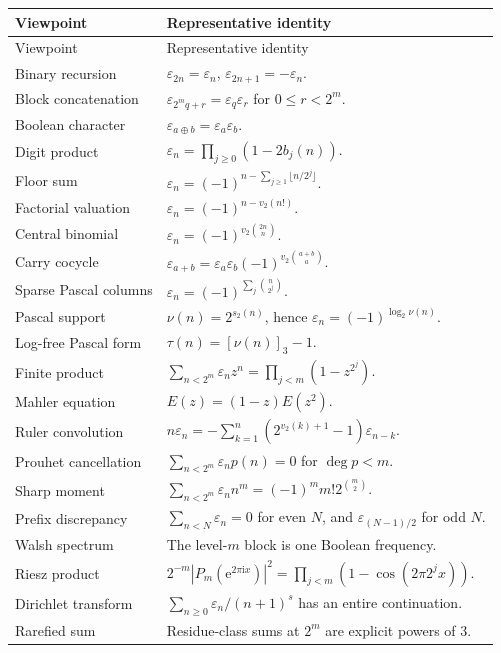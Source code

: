 \documentclass[11pt,oneside]{article}
\theoremstyle{definition}
\theoremstyle{remark}
\newcommand{\e}{\mathrm e}
\newcommand{\ii}{\mathrm i}
\newcommand{\wt}{s_2}
\newcommand{\vtwo}{v_2}
\newcommand{\eps}{\varepsilon}
\newcommand{\xor}{\mathbin{\oplus}}
\newcommand{\res}[2]{\left[#1\right]_{#2}}
\begin{document}
\renewcommand{\arraystretch}{1.18}
\begin{longtable}{@{}p{}p{}@{}}
\toprule
Viewpoint & Representative identity \\
\midrule
\endfirsthead
\toprule
Viewpoint & Representative identity \\
\midrule
\endhead
Binary recursion & \(\eps_{2n}=\eps_n\), \(\eps_{2n+1}=-\eps_n\). \\
Block concatenation & \(\eps_{2^m q+r}=\eps_q\eps_r\) for \(0\le r<2^m\). \\
Boolean character & \(\eps_{a\xor b}=\eps_a\eps_b\). \\
Digit product & \(\eps_n=\prod_{j\ge0}(1-2b_j(n))\). \\
Floor sum & \(\eps_n=(-1)^{n-\sum_{j\ge1}\lfloor n/2^j\rfloor}\). \\
Factorial valuation & \(\eps_n=(-1)^{n-\vtwo(n!)}\). \\
Central binomial & \(\eps_n=(-1)^{\vtwo\binom{2n}{n}}\). \\
Carry cocycle & \(\eps_{a+b}=\eps_a\eps_b(-1)^{\vtwo\binom{a+b}{a}}\). \\
Sparse Pascal columns & \(\eps_n=(-1)^{\sum_j\binom{n}{2^j}}\). \\
Pascal support & \(\nu(n)=2^{\wt(n)}\), hence \(\eps_n=(-1)^{\log_2\nu(n)}\). \\
Log-free Pascal form & \(\tau(n)=\res{\nu(n)}3-1\). \\
Finite product & \(\sum_{n<2^m}\eps_nz^n=\prod_{j<m}(1-z^{2^j})\). \\
Mahler equation & \(E(z)=(1-z)E(z^2)\). \\
Ruler convolution & \(n\eps_n=-\sum_{k=1}^n(2^{\vtwo(k)+1}-1)\eps_{n-k}\). \\
Prouhet cancellation & \(\sum_{n<2^m}\eps_np(n)=0\) for \(\deg p<m\). \\
Sharp moment & \(\sum_{n<2^m}\eps_nn^m=(-1)^m m!2^{\binom m2}\). \\
Prefix discrepancy & \(\sum_{n<N}\eps_n=0\) for even \(N\), and \(\eps_{(N-1)/2}\) for odd \(N\). \\
Walsh spectrum & The level-\(m\) block is one Boolean frequency. \\
Riesz product & \(2^{-m}|P_m(\e^{2\pi\ii x})|^2=\prod_{j<m}(1-\cos(2\pi2^jx))\). \\
Dirichlet transform & \(\sum_{n\ge0}\eps_n/(n+1)^s\) has an entire continuation. \\
Rarefied sum & Residue-class sums at \(2^m\) are explicit powers of \(3\). \\
\bottomrule
\end{longtable}
\renewcommand{\arraystretch}{1}
\end{document}
